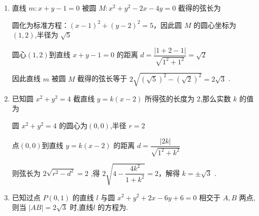 \begin{enumerate}
\begin{jieda}
    \end{jieda}
    \item 直线 $m : x + y - 1 = 0$ 被圆 $M : {x}^{2} + {y}^{2} - {2x} - {4y} = 0$ 截得的弦长为
    \begin{jieda}
        圆化为标准方程：${\left( x - 1\right) }^{2} + {\left( y - 2\right) }^{2} = 5$，因此圆 $M$ 的圆心坐标为$(1,2)$,半径为 $\sqrt{5}$
        
        圆心$(1,2)$到直线 $x + y - 1 = 0$ 的距离 $d = \dfrac{\left| 1 + 2 - 1\right| }{\sqrt{{1}^{2} + {1}^{2}}} = \sqrt{2}$ 
        
        因此直线 $m$ 被圆 $M$ 截得的弦长等于 $2\sqrt{{\left( \sqrt{5}\right) }^{2} - {\left( \sqrt{2}\right) }^{2}} = 2\sqrt{3}$ .
    \end{jieda}
    \item 已知圆 ${x}^{2} + {y}^{2} = 4$ 截直线 $y = k\left( {x - 2}\right)$ 所得弦的长度为 2,那么实数 $k$ 的值为
    \begin{jieda}
        圆 ${x}^{2} + {y}^{2} = 4$ 的圆心为$(0,0)$,半径 $r = 2$
        
        点$(0,0)$到直线 $y = k\left( {x - 2}\right)$ 的距离 $d = \dfrac{\left| 2k\right| }{\sqrt{{1}^{2} + {k}^{2}}}$
        
        则弦长为 $2\sqrt{{r}^{2} - {d}^{2}} = 2$ ,得 $2\sqrt{4 - \dfrac{4{k}^{2}}{1 + {k}^{2}}} = 2$，解得 $k =  \pm  \sqrt{3}$ .
    \end{jieda}    
    \item 已知过点 $P\left( {0,1}\right)$ 的直线 $l$ 与圆 ${x}^{2} + {y}^{2} + {2x} - {6y} + 6 = 0$ 相交于 $A,B$ 两点,则当 $\left| {AB}\right|  = 2\sqrt{3}$ 时,直线$l$ 的方程为.


\end{enumerate}
